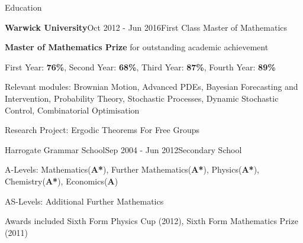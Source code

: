 \documentclass{resume} %
\begin{document}
\begin{rSection}{Education}
	\begin{rSubsection}{\bf Warwick University}{Oct 2012 - Jun 2016}{First Class Master of Mathematics}{}
\item {\bf Master of Mathematics Prize} for outstanding academic achievement
\item First Year: {\bf 76\%}, Second Year: {\bf 68\%}, Third Year: {\bf 87\%}, Fourth Year: {\bf 89\%}
\item Relevant modules: Brownian Motion, Advanced PDEs, Bayesian Forecasting and Intervention, Probability Theory, Stochastic Processes, Dynamic Stochastic Control, Combinatorial Optimisation
\item Research Project: Ergodic Theorems For Free Groups
\end{rSubsection}
\begin{rSubsection}{Harrogate Grammar School}{Sep 2004 - Jun 2012}{Secondary School}{}
\item A-Levels: Mathematics({\bf A*}), Further Mathematics({\bf A*}), Physics({\bf A*}), Chemistry({\bf A*}), Economics({\bf A})
\item AS-Levels: Additional Further Mathematics
\item Awards included Sixth Form Physics Cup (2012), Sixth Form Mathematics Prize (2011)
	\end{rSubsection}

\end{rSection}

\end{document}
